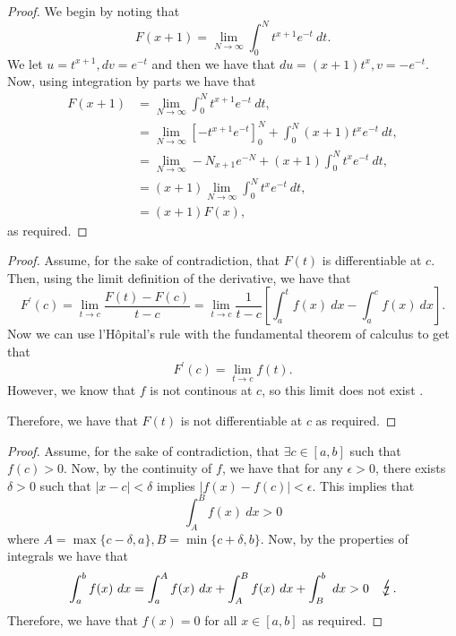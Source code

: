\documentclass[twoside]{article}
\begin{document}
\begin{proof}
	We begin by noting that
	\begin{equation*}
		F(x + 1) = \lim_{N \to \infty} \int_{0}^{N} t^{x + 1}e^{-t} \ dt.
	\end{equation*}
	We let $u = t^{x + 1}, dv = e^{-t}$
	and then we have that $du = (x + 1)t^{x}, v = -e^{-t}$.
	Now, using integration by parts we have that
	\begin{align*}
		F(x + 1)
		 & = \lim_{N \to \infty} \int_{0}^{N} t^{x + 1}e^{-t} \ dt,                        \\
		 & = \lim_{N \to \infty} \left[-t^{x + 1}e^{-t}\right]_{0}^{N}
		+ \int_{0}^{N} (x + 1)t^{x}e^{-t} \ dt,                                            \\
		 & = \lim_{N \to \infty} -N_{x + 1}e^{-N} + (x + 1) \int_{0}^{N} t^{x}e^{-t} \ dt, \\
		 & = (x + 1) \lim_{N \to \infty} \int_{0}^{N} t^{x}e^{-t} \ dt,                    \\
		 & = (x + 1)F(x),
	\end{align*}
	as required.
\end{proof}

\begin{proof}
	Assume, for the sake of contradiction, that $F(t)$ is differentiable at $c$.
	Then, using the limit definition of the derivative, we have that
	\begin{equation*}
		F^{\prime}(c) = \lim_{t \to c} \frac{F(t) - F(c)}{t - c}
		= \lim_{t \to c} \frac{1}{t - c}\left[\int_{a}^{t}f(x) \ dx - \int_{a}^{c} f(x) \ dx\right].
	\end{equation*}
	Now we can use l'H\^opital's rule with the fundamental theorem of calculus
	to get that
	\begin{equation*}
		F^{\prime}(c) = \lim_{t \to c} f(t).
	\end{equation*}
	However, we know that $f$ is not continous at $c$, so this limit does not
	exist \contra.

	Therefore, we have that $F(t)$ is not differentiable at $c$ as required.
\end{proof}

\begin{proof}
	Assume, for the sake of contradiction, that $\exists c \in [a, b]$ such that
	$f(c) > 0$. Now, by the continuity of $f$, we have that for any $\epsilon > 0$,
	there exists $\delta > 0$ such that $|x - c| < \delta$
	implies $|f(x) - f(c)| < \epsilon$. This implies that
	\begin{equation*}
		\int_{A}^{B} f(x) \ dx > 0
	\end{equation*}
	where $A = \max\{c - \delta, a\}, B = \min\{c + \delta, b\}$. Now, by the properties
	of integrals we have that
	\begin{equation*}
		\int_{a}^{b} f(x) \ dx = \int_{a}^{A} f(x) \ dx + \int_{A}^{B} f(x) \ dx
		+ \int_{B}^{b} \ dx > 0 \quad \contra.
	\end{equation*}
	Therefore, we have that $f(x) = 0$ for all $x \in [a,b]$ as required.
\end{proof}
\end{document}

